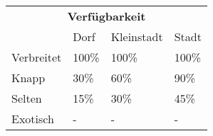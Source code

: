 \documentclass[a4paper, fontsize=10pt twocolumn]{scrartcl}
\begin{document}
\begin{table}[!ht]
    \centering
    \begin{tabularx}{\textwidth}{l|l|l|l}
        \multicolumn{4}{c}{\cellcolor{gray!25} \textbf{Verfügbarkeit}} \\ \cline{1-4}
                   & Dorf  & Kleinstadt & Stadt                        \\ \cline{1-4}
        Verbreitet & 100\% & 100\%      & 100\%                        \\
        Knapp      & 30\%  & 60\%       & 90\%                         \\
        Selten     & 15\%  & 30\%       & 45\%                         \\
        Exotisch   & -     & -          & -
    \end{tabularx}
\end{table}
\end{document}
